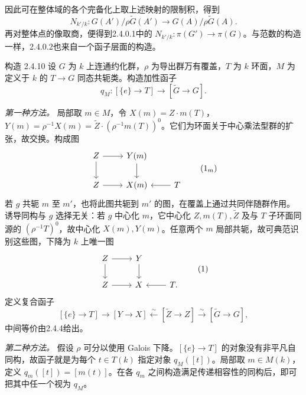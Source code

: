 因此可在整体域的各个完备化上取上述映射的限制积，得到
\[
 N_{k'/k}:G(A')/\rho\widetilde G(A')\longrightarrow G(A)/\rho\widetilde G(A).
\]
再对整体点的像取商，便得到2.4.0.1中的 $N_{k'/k}:\pi(G')\to\pi(G)$。与范数的构造一样，2.4.0.2也来自一个函子层面的构造。
\begin{originaltheorem}{构造 2.4.10}
设 $G$ 为 $k$ 上连通约化群，$\rho$ 为导出群万有覆盖，$T$ 为 $k$ 环面，$M$ 为定义于 $k$ 的 $T\to G$ 同态共轭类。构造加性函子
\[
 q_M:[\{e\}\to T]\longrightarrow[\widetilde G\to G].
\]
\end{originaltheorem}
\emph{第一种方法。} 局部取 $m\in M$，令 $X(m)=Z\cdot m(T)$，$Y(m)=\rho^{-1}X(m)=\widetilde Z\cdot(\rho^{-1}m(T))^0$。它们为环面关于中心乘法型群的扩张，故交换。构成图
\[
 \begin{tikzcd}
 \widetilde Z\arrow[r]\arrow[d]&Y(m)\arrow[d]&\\
 Z\arrow[r]&X(m)&T\arrow[l]
 \end{tikzcd}\tag{$1_m$}
\]
若 $g$ 共轭 $m$ 至 $m'$，也将此图共轭到 $m'$ 的图，在覆盖上通过共同伴随群作用。诱导同构与 $g$ 选择无关：若 $g$ 中心化 $m$，它中心化 $Z,m(T),\widetilde Z$ 及与 $T$ 子环面同源的 $(\rho^{-1}T)^0$，故中心化 $X(m),Y(m)$。任意两个 $m$ 局部共轭，故可典范识别这些图，下降为 $k$ 上唯一图
\[
 \begin{tikzcd}
 \widetilde Z\arrow[r]\arrow[d]&Y\arrow[d]&\\
 Z\arrow[r]&X&T\arrow[l].
 \end{tikzcd}\tag{1}
\]
定义复合函子
\[
 [\{e\}\to T]\longrightarrow[Y\to X]\xleftarrow{\sim}[\widetilde Z\to Z]
 \xrightarrow{\sim}[\widetilde G\to G],
\]
中间等价由2.4.4给出。

\emph{第二种方法。} 假设 $\rho$ 可分以使用 Galois 下降。$[\{e\}\to T]$ 的对象没有非平凡自同构，故函子就是为每个 $t\in T(k)$ 指定对象 $q_M([t])$。局部取 $m\in M(k)$，定义 $q_m([t])=[m(t)]$。在各 $q_m$ 之间构造满足传递相容性的同构后，即可把其中任一个视为 $q_M$。

